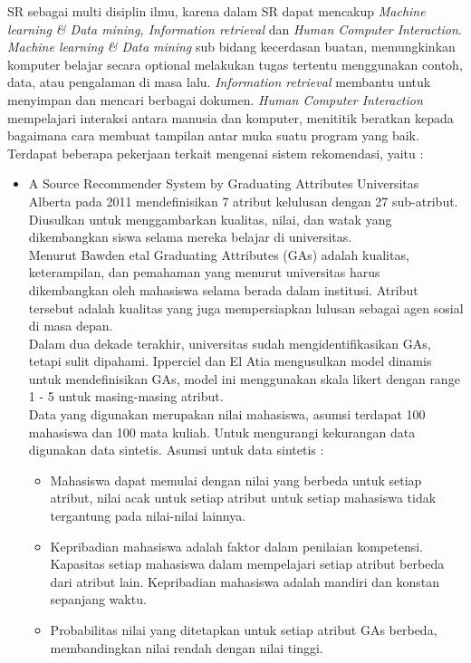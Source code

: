 \documentclass[a4paper,twoside]{article}
\begin{document}
\begin{enumerate}
		SR sebagai multi disiplin ilmu, karena dalam SR dapat mencakup \textit{Machine learning \& Data mining, Information retrieval} dan \textit{Human Computer Interaction}. \textit{Machine learning \& Data mining} sub bidang kecerdasan buatan, memungkinkan komputer belajar secara optional melakukan tugas tertentu menggunakan contoh, data, atau pengalaman di masa lalu. \textit{Information retrieval} membantu untuk menyimpan dan mencari berbagai dokumen. \textit{Human Computer Interaction} mempelajari interaksi antara manusia dan komputer, menititik beratkan kepada bagaimana cara membuat tampilan antar muka suatu program yang baik.\\
		
		Terdapat beberapa pekerjaan terkait mengenai sistem rekomendasi, yaitu :
		\begin{itemize}
			\item A Source Recommender System by Graduating Attributes
				Universitas Alberta pada 2011 mendefinisikan 7 atribut kelulusan dengan 27 sub-atribut. Diusulkan untuk menggambarkan kualitas, nilai, dan watak yang dikembangkan siswa selama mereka belajar di universitas.    \\
				Menurut Bawden etal Graduating Attributes (GAs) adalah kualitas, keterampilan, dan pemahaman yang menurut universitas harus dikembangkan oleh mahasiswa selama berada dalam institusi.  Atribut tersebut adalah kualitas yang juga mempersiapkan lulusan sebagai agen sosial di masa depan.\\
				Dalam dua dekade terakhir, universitas sudah mengidentifikasikan GAs, tetapi sulit dipahami. Ipperciel dan El Atia mengusulkan model dinamis untuk mendefinisikan GAs, model ini menggunakan skala likert dengan range 1 - 5 untuk masing-masing atribut.\\
				Data yang digunakan merupakan nilai mahasiswa, asumsi terdapat 100 mahasiswa dan 100 mata kuliah. Untuk mengurangi kekurangan data digunakan data sintetis. Asumsi untuk data sintetis :
				\begin{itemize}
				\item Mahasiswa dapat memulai dengan nilai yang berbeda untuk setiap atribut, nilai acak untuk setiap atribut untuk setiap mahasiswa tidak tergantung pada nilai-nilai lainnya.
				\item Kepribadian mahasiswa adalah faktor dalam penilaian kompetensi. Kapasitas setiap mahasiswa dalam mempelajari setiap atribut berbeda dari atribut lain. Kepribadian mahasiswa adalah mandiri dan konstan sepanjang waktu.
				\item Probabilitas nilai yang ditetapkan untuk setiap atribut GAs berbeda, membandingkan nilai rendah dengan nilai tinggi.

\end{itemize}
\end{itemize}
\end{enumerate}
\end{document}
